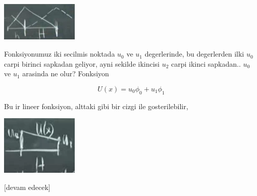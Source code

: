 \documentclass[12pt,fleqn]{article}\usepackage{../../common}
\begin{document}
\includegraphics[width=10em]{compscieng_1_20_02.png}

Fonksiyonumuz iki secilmis noktada $u_0$ ve $u_1$ degerlerinde, bu degerlerden
ilki $u_0$ carpi birinci sapkadan geliyor, ayni sekilde ikincisi $u_2$ carpi
ikinci sapkadan.. $u_0$ ve $u_1$ arasinda ne olur? Fonksiyon

$$
U(x) = u_0 \phi_0 + u_1 \phi_1
$$

Bu ir lineer fonksiyon, alttaki gibi bir cizgi ile gosterilebilir,

\includegraphics[width=10em]{compscieng_1_20_03.png}

















[devam edecek]
\end{document}
